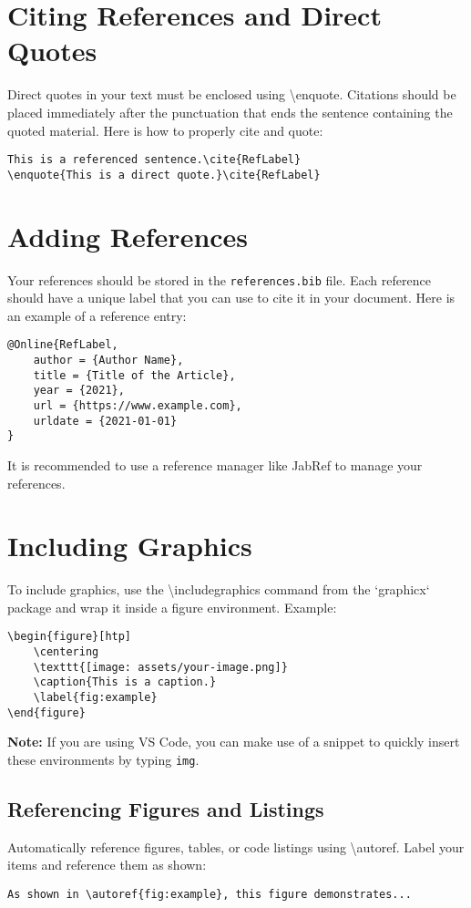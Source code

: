 \section{Citing References and Direct Quotes}
Direct quotes in your text must be enclosed using \textbackslash enquote{}. Citations should be placed immediately after the punctuation that ends the sentence containing the quoted material. Here is how to properly cite and quote:
\begin{verbatim}
This is a referenced sentence.\cite{RefLabel}
\enquote{This is a direct quote.}\cite{RefLabel}
\end{verbatim}

\section{Adding References}
Your references should be stored in the \texttt{references.bib} file. Each reference should have a unique label that you can use to cite it in your document. Here is an example of a reference entry:
\begin{verbatim}
@Online{RefLabel,
    author = {Author Name},
    title = {Title of the Article},
    year = {2021},
    url = {https://www.example.com},
    urldate = {2021-01-01}
}
\end{verbatim}

It is recommended to use a reference manager like JabRef to manage your references.

\section{Including Graphics}
To include graphics, use the \textbackslash includegraphics command from the `graphicx` package and wrap it inside a figure environment. Example:
\begin{verbatim}
\begin{figure}[htp]
    \centering
    \texttt{[image: assets/your-image.png]}
    \caption{This is a caption.}
    \label{fig:example}
\end{figure}
\end{verbatim}

\textbf{Note:} If you are using VS Code, you can make use of a snippet to quickly insert these environments by typing \texttt{img}.


\subsection{Referencing Figures and Listings}
Automatically reference figures, tables, or code listings using \textbackslash autoref. Label your items and reference them as shown:
\begin{verbatim}
As shown in \autoref{fig:example}, this figure demonstrates...
\end{verbatim}

